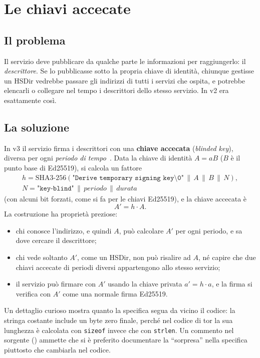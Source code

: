 \section{Le chiavi accecate}\label{sec:os-accecate}

\subsection{Il problema}

Il servizio deve pubblicare da qualche parte le informazioni per raggiungerlo: il \emph{descrittore}. Se lo pubblicasse sotto la propria chiave di identità, chiunque gestisse un HSDir vedrebbe passare gli indirizzi di tutti i servizi che ospita, e potrebbe elencarli o collegare nel tempo i descrittori dello stesso servizio. In v2 era esattamente così.

\subsection{La soluzione}

In v3 il servizio firma i descrittori con una \textbf{chiave accecata} (\emph{blinded key}), diversa per ogni \emph{periodo di tempo}~. Data la chiave di identità $A = aB$ ($B$ è il punto base di Ed25519), si calcola un fattore
\begin{gather*}
h = \mathrm{SHA3\text{-}256}(\texttt{"Derive temporary signing key\textbackslash 0"} \,\|\, A \,\|\, B \,\|\, N), \\
N = \texttt{"key-blind"} \,\|\, \mathit{periodo} \,\|\, \mathit{durata}
\end{gather*}
(con alcuni bit forzati, come si fa per le chiavi Ed25519), e la chiave accecata è
\[
A' = h \cdot A.
\]
La costruzione ha proprietà preziose:
\begin{itemize}
  \item chi conosce l'indirizzo, e quindi $A$, può calcolare $A'$ per ogni periodo, e sa dove cercare il descrittore;
  \item chi vede soltanto $A'$, come un HSDir, non può risalire ad $A$, né capire che due chiavi accecate di periodi diversi appartengono allo stesso servizio;
  \item il servizio può firmare con $A'$ usando la chiave privata $a' = h \cdot a$, e la firma si verifica con $A'$ come una normale firma Ed25519.
\end{itemize}

Un dettaglio curioso mostra quanto la specifica segua da vicino il codice: la stringa costante include un byte zero finale, perché nel codice di tor la sua lunghezza è calcolata con \texttt{sizeof} invece che con \texttt{strlen}. Un commento nel sorgente () ammette che si è preferito documentare la \enquote{sorpresa} nella specifica piuttosto che cambiarla nel codice.

